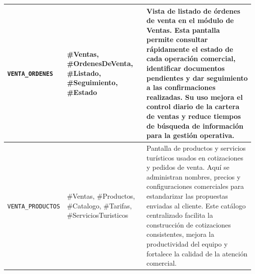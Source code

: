 \documentclass[11pt,a4paper]{article}
\begin{document}
\begin{longtable}{|>{\centering\arraybackslash}m{}|>{\RaggedRight\arraybackslash}m{}|>{\RaggedRight\arraybackslash}m{}|}
\texttt{VENTA\_ORDENES}
&
\#Ventas, \#OrdenesDeVenta, \#Listado, \#Seguimiento, \#Estado
&
Vista de listado de órdenes de venta en el módulo de Ventas. Esta pantalla permite consultar rápidamente el estado de cada operación comercial, identificar documentos pendientes y dar seguimiento a las confirmaciones realizadas. Su uso mejora el control diario de la cartera de ventas y reduce tiempos de búsqueda de información para la gestión operativa.
\\ \hline

\texttt{VENTA\_PRODUCTOS}
&
\#Ventas, \#Productos, \#Catalogo, \#Tarifas, \#ServiciosTuristicos
&
Pantalla de productos y servicios turísticos usados en cotizaciones y pedidos de venta. Aquí se administran nombres, precios y configuraciones comerciales para estandarizar las propuestas enviadas al cliente. Este catálogo centralizado facilita la construcción de cotizaciones consistentes, mejora la productividad del equipo y fortalece la calidad de la atención comercial.
\\ \hline

\end{longtable}
\end{document}
